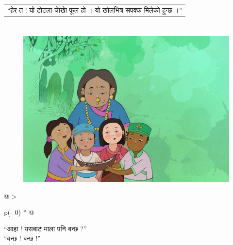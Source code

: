 \documentclass[
  letterpaper,
  DIV=11,
  numbers=noendperiod,
  paper=6in:9in,
  pagesize=pdftex,
  headinclude=on,
  footinclude=on,
  12pt]{scrreprt}
\begin{document}
\hypertarget{p}{}
\begin{longtable}[]{@{}l@{}}
\toprule\noalign{}
\endhead
\bottomrule\noalign{}
\endlastfoot
``हेर त ! यो टोटला चाेखाे फूल हो । यो खोलभित्र सपक्क मिलेको हुन्छ ।'' \\
\end{longtable}


\hypertarget{section-3}{%
\chapter{}\label{section-3}}

\hypertarget{img}{}
\begin{figure}[H]

{\centering \includegraphics{images/p-5.jpg}

}

\end{figure}

\hypertarget{p}{}
\begin{longtable}[]{@{}
  >{\raggedright\arraybackslash}p{(\columnwidth - 0\tabcolsep) * }@{}}
\toprule\noalign{}
\endhead
\bottomrule\noalign{}
\endlastfoot
\begin{minipage}[t]{\linewidth}\raggedright
``आहा ! यसबाट माला पनि बन्छ ?''\\
``बन्छ ! बन्छ !''\strut
\end{minipage} \\
\end{longtable}


\hypertarget{section-4}{%
\chapter{}\label{section-4}}
\end{document}

